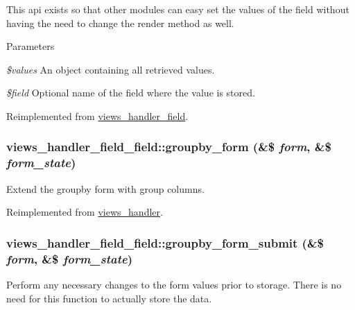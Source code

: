 This api exists so that other modules can easy set the values of the field without having the need to change the render method as well.


\begin{DoxyParams}{Parameters}
\item[{\em \$values}]An object containing all retrieved values. \item[{\em \$field}]Optional name of the field where the value is stored. \end{DoxyParams}


Reimplemented from \hyperlink{classviews__handler__field_a293517c0221b4c11e5c353e518a271c4}{views\_\-handler\_\-field}.\hypertarget{classviews__handler__field__field_a9bd5f09dbd4498880d106ff9d7d1b967}{
\subsubsection[{groupby\_\-form}]{\setlength{\rightskip}{0pt plus 5cm}views\_\-handler\_\-field\_\-field::groupby\_\-form (\&\$ {\em form}, \/  \&\$ {\em form\_\-state})}}
\label{classviews__handler__field__field_a9bd5f09dbd4498880d106ff9d7d1b967}
Extend the groupby form with group columns. 

Reimplemented from \hyperlink{classviews__handler_a22753b2a1aba15a7b0276fe8adb1dd8f}{views\_\-handler}.\hypertarget{classviews__handler__field__field_a2ff4444b58879ac73fefcfcff43f3d0e}{
\subsubsection[{groupby\_\-form\_\-submit}]{\setlength{\rightskip}{0pt plus 5cm}views\_\-handler\_\-field\_\-field::groupby\_\-form\_\-submit (\&\$ {\em form}, \/  \&\$ {\em form\_\-state})}}
\label{classviews__handler__field__field_a2ff4444b58879ac73fefcfcff43f3d0e}
Perform any necessary changes to the form values prior to storage. There is no need for this function to actually store the data. 

